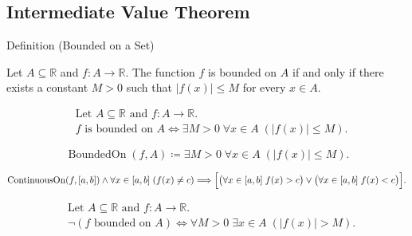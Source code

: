 
\subsection*{Intermediate Value Theorem}
\label{sec:ivt}

\begin{definitionbox}{Definition (Bounded on a Set)}
\begin{definition}
\label{def:bounded-on-a-set}
Let $A \subseteq \mathbb{R}$ and $f \colon A \to \mathbb{R}$. The function $f$ is bounded on $A$ if and only if there exists a constant $M>0$ such that $|f(x)| \le M$ for every $x \in A$.
\end{definition}
\end{definitionbox}

\begin{remark*}
\[
\begin{aligned}
&\text{Let } A \subseteq \mathbb{R} \text{ and } f \colon A \to \mathbb{R}.\\
&f \text{ is bounded on } A
\Longleftrightarrow
\exists M>0 \; \forall x \in A \; (|f(x)| \le M).
\end{aligned}
\]
\end{remark*}

\begin{remark*}
\[
\operatorname{BoundedOn}(f,A) \coloneqq \exists M>0 \; \forall x \in A \; (|f(x)| \le M).
\]
\end{remark*}

\begin{remark*}
\[
\operatorname{ContinuousOn}(f,[a,b])
\land \forall x\in[a,b]\;(f(x)\neq c)
\Longrightarrow
\Bigl[\bigl(\forall x\in[a,b]\; f(x)>c\bigr)
\lor
\bigl(\forall x\in[a,b]\; f(x)<c\bigr)\Bigr].
\]
\end{remark*}

\begin{remark*}
\[
\begin{aligned}
&\text{Let } A \subseteq \mathbb{R} \text{ and } f \colon A \to \mathbb{R}.\\
&\neg(f \text{ bounded on } A)
\Longleftrightarrow
\forall M>0 \; \exists x \in A \; (|f(x)| > M).
\end{aligned}
\]
\end{remark*}

